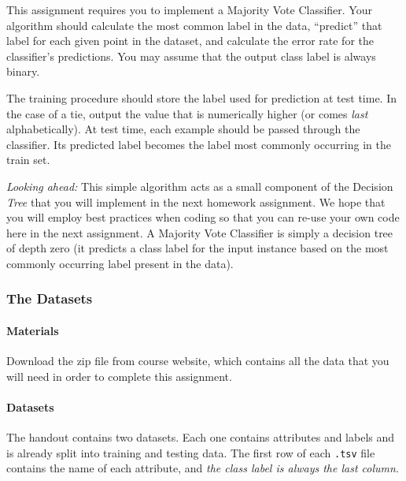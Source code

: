 \documentclass[11pt,addpoints,answers]{exam}
\begin{document}
This assignment requires you to implement a Majority Vote Classifier.  Your algorithm should calculate the most common label in the data, ``predict'' that label for each given point in the dataset, and calculate the error rate for the classifier's predictions. You may assume that the output class label is always binary. 

The training procedure should store the label used for prediction at test time. In the case of a tie, output the value that is numerically higher (or comes \emph{last} alphabetically). At test time, each example should be passed through the classifier. Its predicted label becomes the label most commonly occurring in the train set. 

\emph{Looking ahead:} This simple algorithm acts as a small component of the Decision \emph{Tree} that you will implement in the next homework assignment. We hope that you will employ best practices when coding so that you can re-use your own code here in the next assignment. A Majority Vote Classifier is simply a decision tree of depth zero (it predicts a class label for the input instance based on the most commonly occurring label present in the data).

\subsubsection{The Datasets}
\label{sec:data}

\paragraph{Materials} Download the zip file from course website, which contains all the data that you will need in order to complete this assignment.

\paragraph{Datasets}

The handout contains two datasets. Each one contains attributes and labels and is already split into training and testing data. The first row of each \lstinline{.tsv} file contains the name of each attribute, and \emph{the class label is always the last column}.
\end{document}
